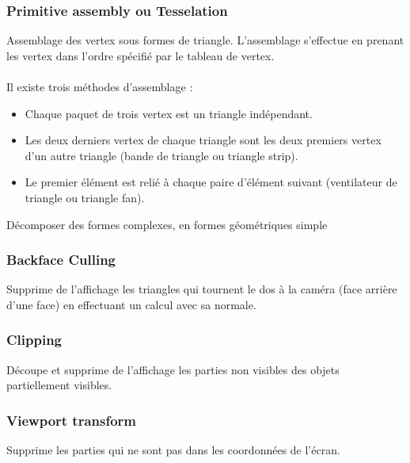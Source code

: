 \subsubsection{Primitive assembly ou Tesselation}
Assemblage des vertex sous formes de triangle. L’assemblage s’effectue en prenant les vertex dans l’ordre spécifié par le tableau de vertex.\\\\
Il existe trois méthodes d’assemblage :
\begin{itemize}
	\item Chaque paquet de trois vertex est un triangle indépendant.
	\item Les deux derniers vertex de chaque triangle sont les deux premiers vertex d’un autre triangle (bande de triangle ou triangle strip).
	\item Le premier élément est relié à chaque paire d’élément suivant (ventilateur de triangle ou triangle fan).
	\end{itemize}
Décomposer des formes complexes, en formes géométriques simple

\subsubsection{Backface Culling}
Supprime de l’affichage les triangles qui  tournent le dos à la caméra (face arrière d’une face) en effectuant un calcul avec sa normale.
\subsubsection{Clipping}
Découpe et supprime de l’affichage les parties non visibles des objets partiellement visibles.
\subsubsection{Viewport transform}
Supprime les parties qui ne sont pas dans les coordonnées de l’écran.

